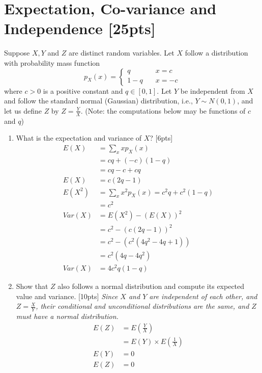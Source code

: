 \documentclass{article}
\begin{document}
\section{Expectation, Co-variance and Independence [25pts]}
Suppose $X,Y$ and $Z$ are distinct random variables. Let $X$ follow a distribution with probability mass function 
\[
p_X(x) =  \begin{cases}
q \quad &x=c\\
1-q \quad &x=-c
\end{cases}
\]
where $c>0$ is a positive constant and $q\in[0,1]$. Let $Y$ be independent from $X$ and follow the standard normal (Gaussian) distribution, i.e., $Y\sim N(0,1)$, and let us define $Z$ by $Z=\frac{Y}{X}$. (Note: the computations below may be functions of $c$ and $q$)
\begin{enumerate}[label=(\alph*)]
\item What is the expectation and variance of $X$? [6pts] \newline \begin{align*}
    E(X) &= \sum_x xp_X(x) \\
    &= cq + (-c)(1-q) \\
    &= cq - c + cq \\
    E(X) &= c(2q - 1) \\
    E(X^2) &= \sum_x x^2p_X(x) = c^2q+c^2(1-q) \\
    &= c^2 \\
    Var(X) &= E(X^2) - (E(X))^2 \\
    &= c^2 - (c(2q-1))^2 \\
    &= c^2 - (c^2(4q^2-4q+1)) \\
    &= c^2(4q-4q^2) \\
    Var(X) &= 4c^2q(1-q)
\end{align*}
\item Show that $Z$ also follows a normal distribution and compute its expected value and variance. [10pts] \newline
        \emph{Since $X$ and $Y$ are independent of each other, and $Z=\frac{X}{Y}$, their conditional and unconditional distributions are the same, and $Z$ must have a normal distribution.} \newline \begin{align*}
            E(Z) &= E(\frac{Y}{X}) \\
            &= E(Y)\times E(\frac{1}{X}) \\
            E(Y) &= 0 \\
            E(Z) &= 0 \\

\end{align*}
\end{enumerate}
\end{document}

